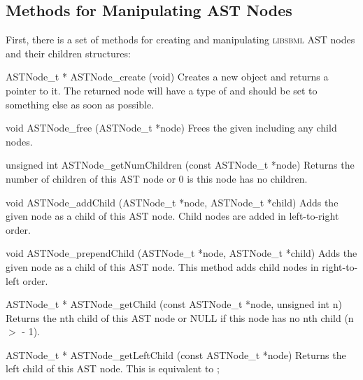 \documentclass{sbmlmanual}
\newcommand{\libsbml}{\textsc{libsbml}}
\begin{document}
\subsection{Methods for Manipulating AST Nodes}

First, there is a set of methods for creating and manipulating \libsbml{}
AST nodes and their children structures:

\begin{methoddef}{ASTNode\_t * ASTNode\_create (void)}
  Creates a new  object and returns a pointer to it.  The
  returned node will have a type of  and should be set
  to something else as soon as possible.
\end{methoddef}


\begin{methoddef}{void ASTNode\_free (ASTNode\_t *node)}
  Frees the given  including any child nodes.
\end{methoddef}


\begin{methoddef}{unsigned int ASTNode\_getNumChildren (const ASTNode\_t *node)}
  Returns the number of children of this AST node or 0 is this node has no
  children.
\end{methoddef}


\begin{methoddef}{void ASTNode\_addChild (ASTNode\_t *node, ASTNode\_t *child)}
  Adds the given node as a child of this AST node.  Child nodes are added
  in left-to-right order.
\end{methoddef}


\begin{methoddef}{void ASTNode\_prependChild (ASTNode\_t *node, ASTNode\_t *child)}
  Adds the given node as a child of this AST node.  This method adds child
  nodes in right-to-left order.
\end{methoddef}


\begin{methoddef}{ASTNode\_t * ASTNode\_getChild (const ASTNode\_t *node, unsigned int n)}
  Returns the nth child of this AST node or NULL if this node has no nth
  child (n $>$  - 1).
\end{methoddef}


\begin{methoddef}{ASTNode\_t * ASTNode\_getLeftChild (const ASTNode\_t *node)}
  Returns the left child of this AST node.  This is equivalent to
  ;
\end{methoddef}
\end{document}
